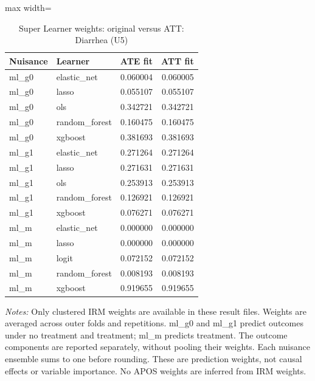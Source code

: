 \begin{table}[htbp]
\centering\scriptsize
\caption{Super Learner weights: original versus ATT: Diarrhea (U5)}
\label{tab:table-ate-att-convex-weights-diarrhea}
\begin{adjustbox}{max width=\linewidth}
\begin{tabular}{llrr}
\toprule
Nuisance & Learner & ATE fit & ATT fit \\
\midrule
ml\_g0 & elastic\_net & 0.060004 & 0.060005 \\
ml\_g0 & lasso & 0.055107 & 0.055107 \\
ml\_g0 & ols & 0.342721 & 0.342721 \\
ml\_g0 & random\_forest & 0.160475 & 0.160475 \\
ml\_g0 & xgboost & 0.381693 & 0.381693 \\
ml\_g1 & elastic\_net & 0.271264 & 0.271264 \\
ml\_g1 & lasso & 0.271631 & 0.271631 \\
ml\_g1 & ols & 0.253913 & 0.253913 \\
ml\_g1 & random\_forest & 0.126921 & 0.126921 \\
ml\_g1 & xgboost & 0.076271 & 0.076271 \\
ml\_m & elastic\_net & 0.000000 & 0.000000 \\
ml\_m & lasso & 0.000000 & 0.000000 \\
ml\_m & logit & 0.072152 & 0.072152 \\
ml\_m & random\_forest & 0.008193 & 0.008193 \\
ml\_m & xgboost & 0.919655 & 0.919655 \\
\bottomrule
\end{tabular}
\end{adjustbox}
\par\vspace{3pt}\begin{minipage}{\linewidth}\scriptsize\textit{Notes:} Only clustered IRM weights are available in these result files. Weights are averaged across outer folds and repetitions. ml\_g0 and ml\_g1 predict outcomes under no treatment and treatment; ml\_m predicts treatment. The outcome components are reported separately, without pooling their weights. Each nuisance ensemble sums to one before rounding. These are prediction weights, not causal effects or variable importance. No APOS weights are inferred from IRM weights.\end{minipage}
\end{table}
